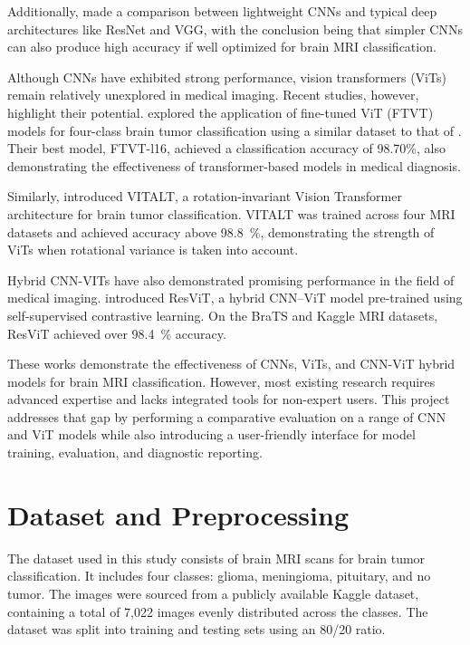 \documentclass[11pt]{article}
\begin{document}
Additionally, \textcite{mahmud2023cnn} made a comparison between lightweight CNNs and typical deep architectures like ResNet and VGG, with the conclusion being that simpler CNNs can also produce high accuracy if well optimized for brain MRI classification.

Although CNNs have exhibited strong performance, vision transformers (ViTs) remain relatively unexplored in medical imaging. Recent studies, however, highlight their potential. \textcite{reddy2024ftvt} explored the application of fine-tuned ViT (FTVT) models for four-class brain tumor classification using a similar dataset to that of \textcite{albalawi2024enhancing}. Their best model, FTVT-l16, achieved a classification accuracy of 98.70\%, also demonstrating the effectiveness of transformer-based models in medical diagnosis.

Similarly, \textcite{poornam2024vitalt} introduced VITALT, a rotation-invariant Vision Transformer architecture for brain tumor classification. VITALT was trained across four MRI datasets and achieved accuracy above 98.8~\%, demonstrating the strength of ViTs when rotational variance is taken into account.

Hybrid CNN-VITs have also demonstrated promising performance in the field of medical imaging. \textcite{karagoz2024resvit} introduced ResViT, a hybrid CNN–ViT model pre-trained using self-supervised contrastive learning. On the BraTS and Kaggle MRI datasets, ResViT achieved over 98.4~\% accuracy.

These works demonstrate the effectiveness of CNNs, ViTs, and CNN-ViT hybrid models for brain MRI classification. However, most existing research requires advanced expertise and lacks integrated tools for non-expert users. This project addresses that gap by performing a comparative evaluation on a range of CNN and ViT models while also introducing a user-friendly interface for model training, evaluation, and diagnostic reporting.

\section{Dataset and Preprocessing}

The dataset used in this study consists of brain MRI scans for brain tumor classification. It includes four classes: glioma, meningioma, pituitary, and no tumor. The images were sourced from a publicly available Kaggle dataset, containing a total of 7,022 images evenly distributed across the classes. The dataset was split into training and testing sets using an 80/20 ratio.
\end{document}
